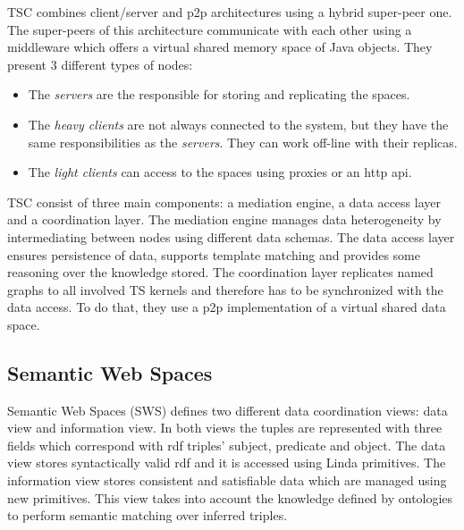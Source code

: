 TSC combines client/server and \ac{p2p} architectures using a hybrid super-peer one.
The super-peers of this architecture communicate with each other using a middleware which offers a virtual shared memory space of Java objects.
They present 3 different types of nodes:
\begin{itemize}
  \item The \emph{servers} are the responsible for storing and replicating the spaces.
  \item The \emph{heavy clients} are not always connected to the system, but they have the same responsibilities as the \emph{servers}.
	They can work off-line with their replicas.
  \item The \emph{light clients} can access to the spaces using proxies or an \ac{http} \acs{api}.
\end{itemize}


TSC consist of three main components: a mediation engine, a data access layer and a coordination layer.
The mediation engine manages data heterogeneity by intermediating between nodes using different data schemas.
The data access layer ensures persistence of data, supports template matching and provides some reasoning over the knowledge stored.
The coordination layer replicates named graphs to all involved TS kernels and therefore has to be synchronized with the data access.
To do that, they use a \ac{p2p} implementation of a virtual shared data space. %



\subsection{Semantic Web Spaces}

Semantic Web Spaces (SWS) \citep{tolksdorf_coordination_2006} defines two different data coordination views: data view and information view.
In both views the tuples are represented with three fields which correspond with \ac{rdf} triples' subject, predicate and object.
The data view stores syntactically valid \ac{rdf} and it is accessed using Linda primitives.
The information view stores consistent and satisfiable data which are managed using new primitives.
This view takes into account the knowledge defined by ontologies to perform semantic matching over inferred triples.

